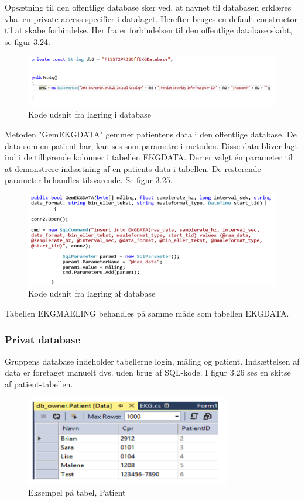 Opsætning til den offentlige database sker ved, at navnet til databasen erklæres vha. en private access specifier i datalaget. Herefter bruges en default constructor til at skabe forbindelse. Her fra er forbindelsen til den offentlige database skabt, se figur 3.24.

\begin{figure}[H]
	\centering
	\includegraphics[width=1\textwidth]{Figurer/Snip20150525_32}	
	\caption{Kode udsnit fra lagring i database}
\end{figure}

Metoden "GemEKGDATA" gemmer patientens data i den offentlige database. De data som en patient har, kan ses som parametre i metoden. Disse data bliver lagt ind i de tilhørende kolonner i tabellen EKGDATA. Der er valgt én parameter til at demonstrere indsætning af en patients data i tabellen. De resterende parameter behandles tilsvarende. Se figur 3.25. 

\begin{figure}[H]
	\centering
	\includegraphics[width=1\textwidth]{Figurer/Snip20150525_33}
	\caption{Kode udsnit fra lagring af database}
\end{figure}

Tabellen EKGMAELING behandles på samme måde som tabellen EKGDATA. 

\subsubsection{Privat database}
Gruppens database indeholder tabellerne login, måling og patient. Indsættelsen af data er foretaget manuelt dvs. uden brug af SQL-kode. I figur 3.26 ses en skitse af patient-tabellen. 

\begin{figure}[H]
	\centering
	\includegraphics[width=0.8\textwidth]{Figurer/Snip20150525_34}
	\caption{Eksempel på tabel, Patient}
\end{figure}

